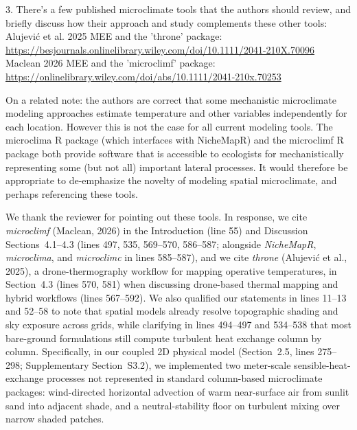 \documentclass[12pt,english]{reviewresponse}
\begin{document}
\begin{revcomment}
3. There's a few published microclimate tools that the authors should review, and briefly discuss how their approach and study complements these other tools:
Alujevi{\'c} et al. 2025 MEE and the 'throne' package: \url{https://besjournals.onlinelibrary.wiley.com/doi/10.1111/2041-210X.70096}
Maclean 2026 MEE and the 'microclimf' package: \url{https://onlinelibrary.wiley.com/doi/abs/10.1111/2041-210x.70253}

On a related note: the authors are correct that some mechanistic microclimate modeling approaches estimate temperature and other variables independently for each location. However this is not the case for all current modeling tools. The microclima R package (which interfaces with NicheMapR) and the microclimf R package both provide software that is accessible to ecologists for mechanistically representing some (but not all) important lateral processes. It would therefore be appropriate to de-emphasize the novelty of modeling spatial microclimate, and perhaps referencing these tools.
\end{revcomment}

\begin{revresponse}
We thank the reviewer for pointing out these tools. In response, we cite \textit{microclimf} (Maclean, 2026) in the Introduction (line 55) and Discussion Sections~4.1--4.3 (lines 497, 535, 569--570, 586--587; alongside \textit{NicheMapR}, \textit{microclima}, and \textit{microclimc} in lines 585--587), and we cite \textit{throne} (Alujevi{\'c} et al., 2025), a drone-thermography workflow for mapping operative temperatures, in Section~4.3 (lines 570, 581) when discussing drone-based thermal mapping and hybrid workflows (lines 567--592). We also qualified our statements in lines 11--13 and 52--58 to note that spatial models already resolve topographic shading and sky exposure across grids, while clarifying in lines 494--497 and 534--538 that most bare-ground formulations still compute turbulent heat exchange column by column. Specifically, in our coupled 2D physical model (Section~2.5, lines 275--298; Supplementary Section~S3.2), we implemented two meter-scale sensible-heat-exchange processes not represented in standard column-based microclimate packages: wind-directed horizontal advection of warm near-surface air from sunlit sand into adjacent shade, and a neutral-stability floor on turbulent mixing over narrow shaded patches.
\end{revresponse}
\end{document}
